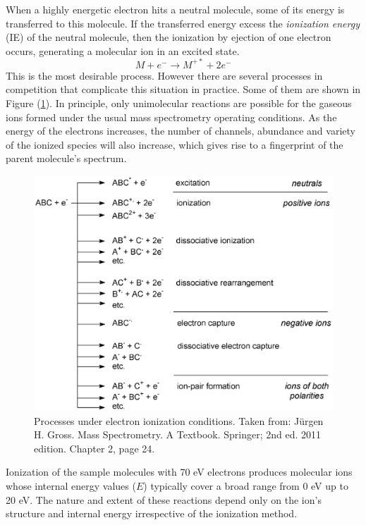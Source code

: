 \documentclass[a4paper,12pt]{article}
\begin{document}
When a highly energetic electron hits a neutral molecule, some of its energy is 
transferred to
this molecule. If the transferred energy excess the \textit{ionization energy} (IE) of the neutral molecule, then the 
ionization by ejection of one electron occurs,
generating a molecular ion in an excited state.
\begin{equation}
M+e^{-} \longrightarrow M^{+*} + 2e^-
\end{equation}
This is the most desirable process. However there are several processes in competition that complicate this situation in practice.
Some of them are shown in Figure (\ref{fig: Processes under EI}).
In principle, only unimolecular reactions are possible for the gaseous ions formed under the usual mass spectrometry
operating conditions. 
As the energy of the electrons increases, the number of channels, abundance and
variety of the ionized species will also increase, which gives rise to a fingerprint of the parent molecule's spectrum.

\begin{figure}[ht]
\centering
\includegraphics[scale=0.6]{images/processesUnderElectronIonization.eps}
\caption{\footnotesize{
Processes under electron ionization conditions. Taken from: Jürgen H. Gross. Mass Spectrometry. A Textbook. Springer; 2nd ed. 2011 edition. Chapter 2, page 24.
}}
\label{fig: Processes under EI}
\end{figure}

Ionization of the sample molecules with 70 eV electrons produces molecular ions whose internal energy values ($E$)
typically cover a broad range from 0 eV up to 20 eV.
The nature and extent of these reactions depend only on the ion's structure and internal
energy irrespective of the ionization method.
\end{document}
